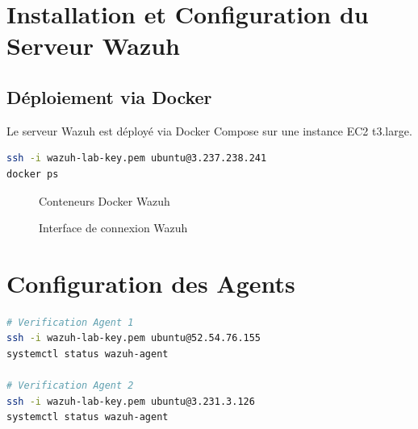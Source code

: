 \documentclass[12pt,a4paper]{article}
\begin{document}
\section{Installation et Configuration du Serveur Wazuh}

\subsection{Déploiement via Docker}

Le serveur Wazuh est déployé via Docker Compose sur une instance EC2 t3.large.

\begin{lstlisting}[language=bash]
ssh -i wazuh-lab-key.pem ubuntu@3.237.238.241
docker ps
\end{lstlisting}

\begin{figure}[H]
    \centering
    \caption{Conteneurs Docker Wazuh}
    \label{fig:docker-ps}
\end{figure}

\begin{figure}[H]
    \centering
    \caption{Interface de connexion Wazuh}
    \label{fig:wazuh-login}
\end{figure}

\section{Configuration des Agents}

\begin{lstlisting}[language=bash]
# Verification Agent 1
ssh -i wazuh-lab-key.pem ubuntu@52.54.76.155
systemctl status wazuh-agent

# Verification Agent 2
ssh -i wazuh-lab-key.pem ubuntu@3.231.3.126
systemctl status wazuh-agent
\end{lstlisting}
\end{document}
